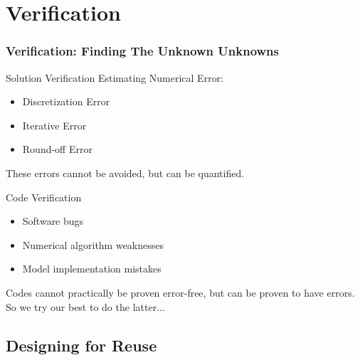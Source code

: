 \section{Verification}

\begin{frame}
\frametitle{Verification: Finding The Unknown Unknowns}
\begin{block}{Solution Verification}
Estimating Numerical Error:
\begin{itemize}
\item Discretization Error
\item Iterative Error
\item Round-off Error
\end{itemize}
These errors cannot be avoided, but can be quantified.
\end{block}
\begin{block}{Code Verification}
\begin{itemize}
\item Software bugs
\item Numerical algorithm weaknesses
\item Model implementation mistakes
\end{itemize}
Codes cannot practically be proven error-free, but can be proven to
have errors.  So we try our best to do the latter...

\end{block}

\end{frame}


\subsection{Designing for Reuse}

